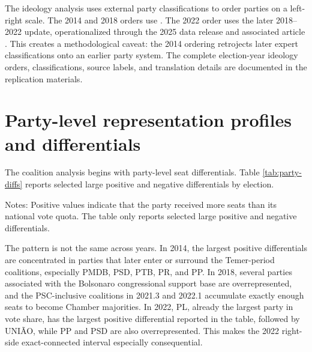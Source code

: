 \documentclass[11pt]{article}
\begin{document}
The ideology analysis uses external party classifications to order parties on a
left-right scale. The 2014 and 2018 orders use \textcite{bolognesi2023nova}. The 2022 order
uses the later 2018--2022 update, operationalized through the 2025 data release
and associated article \parencite{bolognesi2025dataverse,bolognesi2026desaparecimento}.
This creates a methodological caveat: the 2014 ordering retrojects later expert
classifications onto an earlier party system. The complete election-year
ideology orders, classifications, source labels, and translation details are
documented in the replication materials.

\section{Party-level representation profiles and differentials}
\label{sec:party}

The coalition analysis begins with party-level seat differentials. Table
\ref{tab:party-diffs} reports selected large positive and negative differentials
by election.  

\begin{table}[htbp]
\centering
\caption{Largest party-level seat differentials by election}
\label{tab:party-diffs}
\small

\begin{flushleft}
\footnotesize Notes: Positive values indicate that the party received more seats than its national vote quota. The table only reports selected large positive and negative differentials.
\end{flushleft}
\end{table}

The pattern is not the same across years. In 2014, the largest positive
differentials are concentrated in parties that later enter or surround the
Temer-period coalitions, especially PMDB, PSD, PTB, PR, and PP. In 2018,
several parties associated with the Bolsonaro congressional support base are
overrepresented, and the PSC-inclusive coalitions in 2021.3 and 2022.1
accumulate exactly enough seats to become Chamber majorities. In 2022, PL,
already the largest party in vote share, has the largest positive differential
reported in the table,
followed by UNIÃO, while PP and PSD are also overrepresented. This makes the
2022 right-side exact-connected interval especially consequential.
\end{document}
